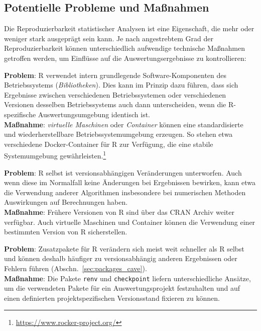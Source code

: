 \subsection{Potentielle Probleme und Maßnahmen}

Die Reproduzierbarkeit statistischer Analysen ist eine Eigenschaft, die mehr oder weniger stark ausgeprägt sein kann. Je nach angestrebtem Grad der Reproduzierbarkeit können unterschiedlich aufwendige technische Maßnahmen getroffen werden, um Einflüsse auf die Auswertungsergebnisse zu kontrollieren:

\textbf{Problem}: R verwendet intern grundlegende Software-Komponenten des Betriebssystems (\emph{Bibliotheken}). Dies kann im Prinzip dazu führen, dass sich Ergebnisse zwischen verschiedenen Betriebssystemen oder verschiedenen Versionen desselben Betriebssystems auch dann unterscheiden, wenn die R-spezifische Auswertungsumgebung identisch ist.\\
\textbf{Maßnahme}: \emph{virtuelle Maschinen} oder \emph{Container} können eine standardisierte und wiederherstellbare Betriebssystemumgebung erzeugen. So stehen etwa verschiedene Docker-Container für R \cite{Boettiger2017} zur Verfügung, die eine stabile Systemumgebung gewährleisten.\footnote{\url{https://www.rocker-project.org/}}

\textbf{Problem}: R selbst ist versionsabhängigen Veränderungen unterworfen. Auch wenn diese im Normalfall keine Änderungen bei Ergebnissen bewirken, kann etwa die Verwendung anderer Algorithmen insbesondere bei numerischen Methoden Auswirkungen auf Berechnungen haben.\\
\textbf{Maßnahme}: Frühere Versionen von R sind über das CRAN Archiv weiter verfügbar. Auch virtuelle Maschinen und Container können die Verwendung einer bestimmten Version von R sicherstellen.

\textbf{Problem}: Zusatzpakete für R verändern sich meist weit schneller als R selbst und können deshalb häufiger zu versionsabhängig anderen Ergebnissen oder Fehlern führen (Abschn.\ \ref{sec:packages_cave}).\\
\textbf{Maßnahme}: Die Pakete \lstinline!renv! \cite{Ushey2019} und \lstinline!checkpoint! \cite{Microsoft2016b} liefern unterschiedliche Ansätze, um die verwendeten Pakete für ein Auswertungsprojekt festzuhalten und auf einen definierten projektspezifischen Versionsstand fixieren zu können.

